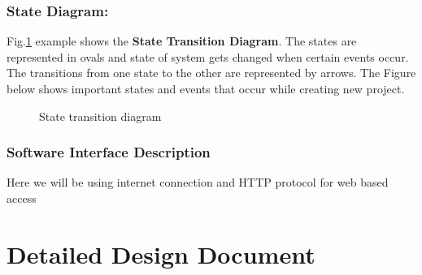 \documentclass[11pt,fleqn]{book} %
\begin{document}
\subsection{State Diagram:}
Fig.\ref{fig:state-dig} example shows the \textbf{\color{ocre}State Transition Diagram}. The states are represented in ovals and state of system gets changed when certain events occur. The transitions from one state to the other are represented by arrows. The Figure below shows important states and events that occur while creating new project.
\begin{center}
	\begin{figure}[!htbp]
		\centering
	  \caption{State transition diagram}
	  \label{fig:state-dig}
	\end{figure}
\end{center} 
 

 \subsection{Software Interface Description}	 
Here we will be using internet connection and HTTP protocol for web based access

\chapter{Detailed Design Document}
\end{document}
